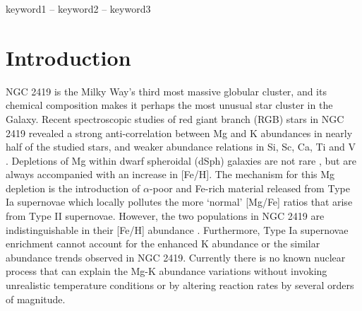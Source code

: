 \documentclass[a4paper,fleqn,usenatbib]{mnras}
\newcommand{\todo}[1]{\textcolor{red}{#1}}
\begin{document}
\begin{keywords}
keyword1 -- keyword2 -- keyword3
\end{keywords}



\section{Introduction}

NGC 2419 is the Milky Way's third most massive globular cluster, and its chemical composition makes it perhaps the most unusual star cluster in the Galaxy. Recent spectroscopic studies of red giant branch (RGB) stars in NGC 2419 revealed a strong anti-correlation between Mg and K abundances in nearly half of the studied stars, and weaker abundance relations in Si, Sc, Ca, Ti and V \citep{mucciarelli2012,cohenkirby2012}. Depletions of Mg within dwarf spheroidal (dSph) galaxies are not rare \citep{mucciarelli2012}, but are always accompanied with an increase in [Fe/H].
The mechanism for this Mg depletion is the introduction of $\alpha$-poor and Fe-rich material released from Type Ia supernovae \citep{tsujimoto2012first} which locally pollutes the more `normal' [Mg/Fe] ratios that arise from Type II supernovae. However, the two populations in NGC 2419 are indistinguishable in their [Fe/H] abundance \citep{cohenkirby2012}. Furthermore, Type Ia supernovae enrichment cannot account for the enhanced K abundance or the similar  abundance trends observed in NGC 2419. Currently there is no known nuclear process that can explain the Mg-K abundance variations  without invoking unrealistic temperature conditions or by altering reaction rates by several orders of magnitude. 




\end{document}
